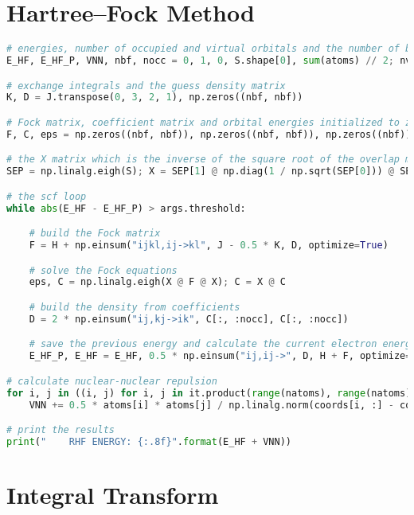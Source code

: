\section{\texorpdfstring{Hartree--Fock Method\label{sec:hf_code_solution}}{Hartree--Fock Method}}

\raggedbottom\begin{lstlisting}[language=Python, caption={\acrshort{hf} method exercise code solution.}, label=code:hf_solution]
# energies, number of occupied and virtual orbitals and the number of basis functions
E_HF, E_HF_P, VNN, nbf, nocc = 0, 1, 0, S.shape[0], sum(atoms) // 2; nvirt = nbf - nocc

# exchange integrals and the guess density matrix
K, D = J.transpose(0, 3, 2, 1), np.zeros((nbf, nbf))

# Fock matrix, coefficient matrix and orbital energies initialized to zero
F, C, eps = np.zeros((nbf, nbf)), np.zeros((nbf, nbf)), np.zeros((nbf))

# the X matrix which is the inverse of the square root of the overlap matrix
SEP = np.linalg.eigh(S); X = SEP[1] @ np.diag(1 / np.sqrt(SEP[0])) @ SEP[1].T

# the scf loop
while abs(E_HF - E_HF_P) > args.threshold:

    # build the Fock matrix
    F = H + np.einsum("ijkl,ij->kl", J - 0.5 * K, D, optimize=True)

    # solve the Fock equations
    eps, C = np.linalg.eigh(X @ F @ X); C = X @ C

    # build the density from coefficients
    D = 2 * np.einsum("ij,kj->ik", C[:, :nocc], C[:, :nocc])

    # save the previous energy and calculate the current electron energy
    E_HF_P, E_HF = E_HF, 0.5 * np.einsum("ij,ij->", D, H + F, optimize=True)

# calculate nuclear-nuclear repulsion
for i, j in ((i, j) for i, j in it.product(range(natoms), range(natoms)) if i != j):
    VNN += 0.5 * atoms[i] * atoms[j] / np.linalg.norm(coords[i, :] - coords[j, :])

# print the results
print("    RHF ENERGY: {:.8f}".format(E_HF + VNN))
\end{lstlisting}

\section{\texorpdfstring{Integral Transform\label{sec:int_code_solution}}{Integral Transform}}

